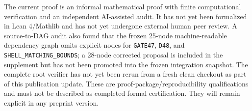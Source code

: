 \documentclass[11pt]{article}
\theoremstyle{definition}
\theoremstyle{remark}
\begin{document}
The current proof is an informal mathematical proof with finite
computational verification and an independent AI-assisted audit. It has
not yet been formalized in Lean 4/Mathlib and has not yet undergone external
human peer review. A source-to-DAG audit also found that the frozen
25-node machine-readable dependency graph omits explicit nodes for
\texttt{GATE47}, \texttt{D48}, and \texttt{SHELL\_MATCHING\_BOUNDS};
a 28-node corrected proposal is included in the supplement but has not
been promoted into the frozen integration snapshot. The complete root
verifier has not yet been rerun from a fresh clean checkout as part of
this publication update. These are proof-package/reproducibility
qualifications and must not be described as completed formal certification.
They will remain explicit in any preprint version.



\end{document}
